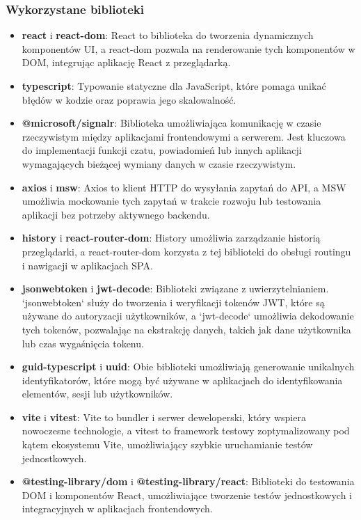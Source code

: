 \documentclass[12pt,a4paper]{article}
\begin{document}
\newpage
\subsubsection{Wykorzystane biblioteki}

\begin{itemize} 
    \item \textbf{react} i \textbf{react-dom}: React to biblioteka do tworzenia dynamicznych komponentów UI, a react-dom pozwala na renderowanie tych komponentów w DOM, integrując aplikację React z przeglądarką. 
    \item \textbf{typescript}: Typowanie statyczne dla JavaScript, które pomaga unikać błędów w kodzie oraz poprawia jego skalowalność.
    \item \textbf{@microsoft/signalr}: Biblioteka umożliwiająca komunikację w czasie rzeczywistym między aplikacjami frontendowymi a serwerem. Jest kluczowa do implementacji funkcji czatu, powiadomień lub innych aplikacji wymagających bieżącej wymiany danych w czasie rzeczywistym.
    \item \textbf{axios} i \textbf{msw}: Axios to klient HTTP do wysyłania zapytań do API, a MSW umożliwia mockowanie tych zapytań w trakcie rozwoju lub testowania aplikacji bez potrzeby aktywnego backendu. 
    \item \textbf{history} i \textbf{react-router-dom}: History umożliwia zarządzanie historią przeglądarki, a react-router-dom korzysta z tej biblioteki do obsługi routingu i nawigacji w aplikacjach SPA. 
    \item \textbf{jsonwebtoken} i \textbf{jwt-decode}: Biblioteki związane z uwierzytelnianiem. `jsonwebtoken` służy do tworzenia i weryfikacji tokenów JWT, które są używane do autoryzacji użytkowników, a `jwt-decode` umożliwia dekodowanie tych tokenów, pozwalając na ekstrakcję danych, takich jak dane użytkownika lub czas wygaśnięcia tokenu.
    \item \textbf{guid-typescript} i \textbf{uuid}: Obie biblioteki umożliwiają generowanie unikalnych identyfikatorów, które mogą być używane w aplikacjach do identyfikowania elementów, sesji lub użytkowników. 
    \item \textbf{vite} i \textbf{vitest}: Vite to bundler i serwer deweloperski, który wspiera nowoczesne technologie, a vitest to framework testowy zoptymalizowany pod kątem ekosystemu Vite, umożliwiający szybkie uruchamianie testów jednostkowych. 
    \item \textbf{@testing-library/dom} i \textbf{@testing-library/react}: Biblioteki do testowania DOM i komponentów React, umożliwiające tworzenie testów jednostkowych i integracyjnych w aplikacjach frontendowych. 

\end{itemize}
\end{document}
